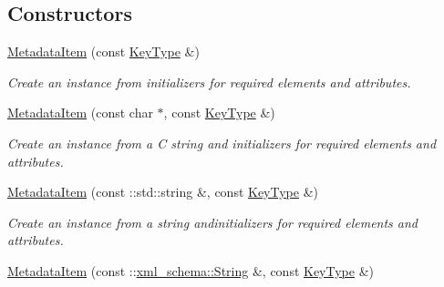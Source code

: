 \subsection*{Constructors}
\begin{DoxyCompactItemize}
\item 
\hypertarget{classopenstack_1_1xml_1_1MetadataItem_a5692d20cd08d3bce4f5e9378a9d38208}{
\hyperlink{classopenstack_1_1xml_1_1MetadataItem_a5692d20cd08d3bce4f5e9378a9d38208}{MetadataItem} (const \hyperlink{classopenstack_1_1xml_1_1MetadataKey}{KeyType} \&)}
\label{classopenstack_1_1xml_1_1MetadataItem_a5692d20cd08d3bce4f5e9378a9d38208}

\begin{DoxyCompactList}\small\item\em Create an instance from initializers for required elements and attributes. \item\end{DoxyCompactList}\item 
\hypertarget{classopenstack_1_1xml_1_1MetadataItem_abc2ce1f108a06de363296d089c398e87}{
\hyperlink{classopenstack_1_1xml_1_1MetadataItem_abc2ce1f108a06de363296d089c398e87}{MetadataItem} (const char $\ast$, const \hyperlink{classopenstack_1_1xml_1_1MetadataKey}{KeyType} \&)}
\label{classopenstack_1_1xml_1_1MetadataItem_abc2ce1f108a06de363296d089c398e87}

\begin{DoxyCompactList}\small\item\em Create an instance from a C string and initializers for required elements and attributes. \item\end{DoxyCompactList}\item 
\hypertarget{classopenstack_1_1xml_1_1MetadataItem_a1b6f53f490d0733493bb59ed6a2123e3}{
\hyperlink{classopenstack_1_1xml_1_1MetadataItem_a1b6f53f490d0733493bb59ed6a2123e3}{MetadataItem} (const ::std::string \&, const \hyperlink{classopenstack_1_1xml_1_1MetadataKey}{KeyType} \&)}
\label{classopenstack_1_1xml_1_1MetadataItem_a1b6f53f490d0733493bb59ed6a2123e3}

\begin{DoxyCompactList}\small\item\em Create an instance from a string andinitializers for required elements and attributes. \item\end{DoxyCompactList}\item 
\hypertarget{classopenstack_1_1xml_1_1MetadataItem_a8b6da5b76f8de342d70c76f9cc9bb605}{
\hyperlink{classopenstack_1_1xml_1_1MetadataItem_a8b6da5b76f8de342d70c76f9cc9bb605}{MetadataItem} (const ::\hyperlink{namespacexml__schema_af6757b5701ccc893f3b551bd70e0c94d}{xml\_\-schema::String} \&, const \hyperlink{classopenstack_1_1xml_1_1MetadataKey}{KeyType} \&)}
\label{classopenstack_1_1xml_1_1MetadataItem_a8b6da5b76f8de342d70c76f9cc9bb605}


\end{DoxyCompactItemize}
